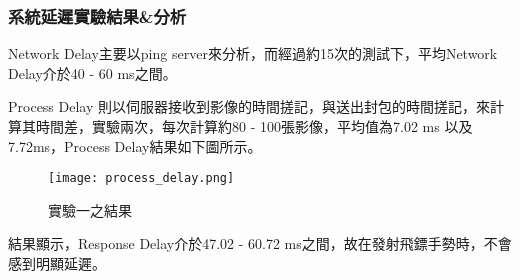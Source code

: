 \subsubsection{系統延遲實驗結果\&分析}
Network Delay主要以ping server來分析，而經過約15次的測試下，平均Network Delay介於40 - 60 ms之間。

Process Delay 則以伺服器接收到影像的時間搓記，與送出封包的時間搓記，來計算其時間差，實驗兩次，每次計算約80 - 100張影像，平均值為7.02 ms 以及7.72ms，Process Delay結果如下圖所示。

\begin{figure}[h]
    \centering	
    \texttt{[image: process\_delay.png]}
    \caption{實驗一之結果}
    \label{fig:Process delay bar chart}
\end{figure}

結果顯示，Response Delay介於47.02 - 60.72 ms之間，故在發射飛鏢手勢時，不會感到明顯延遲。

